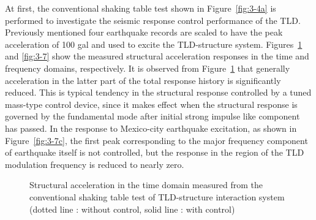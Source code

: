 At first, the conventional shaking table test shown in Figure~\ref{fig:3-4a} is performed to investigate the seismic response control performance of the TLD. Previously mentioned four earthquake records are scaled to have the peak acceleration of 100 gal and used to excite the TLD-structure system. Figures~\ref{fig:3-6} and \ref{fig:3-7} show the measured structural acceleration responses in the time and frequency domains, respectively. It is observed from Figure~\ref{fig:3-6} that generally acceleration in the latter part of the total response history is significantly reduced. This is typical tendency in the structural response controlled by a tuned mass-type control device, since it makes effect when the structural response is governed by the fundamental mode after initial strong impulse like component has passed. In the response to Mexico-city earthquake excitation, as shown in Figure~\ref{fig:3-7c}, the first peak corresponding to the major frequency component of earthquake itself is not controlled, but the response in the region of the TLD modulation frequency is reduced to nearly zero.

\begin{figure}[!ht]
\centering
\caption{Structural acceleration in the time domain measured from the conventional shaking table test of TLD-structure interaction system (dotted line : without control, solid line : with control)}
\label{fig:3-6}
\end{figure}

